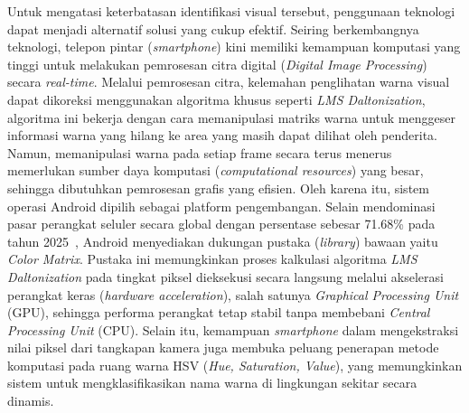 \setlength{\parindent}{2em} Untuk mengatasi keterbatasan identifikasi visual tersebut, penggunaan teknologi dapat menjadi alternatif solusi yang cukup efektif.
Seiring berkembangnya teknologi, telepon pintar (\textit{smartphone}) kini memiliki kemampuan komputasi yang tinggi untuk melakukan pemrosesan citra digital (\textit{Digital Image Processing}) secara \textit{real-time}.
Melalui pemrosesan citra, kelemahan penglihatan warna visual dapat dikoreksi menggunakan algoritma khusus seperti \textit{LMS Daltonization}, algoritma ini bekerja dengan cara memanipulasi matriks warna untuk menggeser informasi warna yang hilang ke area yang masih dapat dilihat oleh penderita.
Namun, memanipulasi warna pada setiap frame secara terus menerus memerlukan sumber daya komputasi (\textit{computational resources}) yang besar, sehingga dibutuhkan pemrosesan grafis yang efisien.
Oleh karena itu, sistem operasi Android dipilih sebagai platform pengembangan.
Selain mendominasi pasar perangkat seluler secara global dengan persentase sebesar 71.68\% pada tahun 2025~\parencite{statcounter2025mobile}, Android menyediakan dukungan pustaka (\textit{library}) bawaan yaitu \textit{Color Matrix}.
Pustaka ini memungkinkan proses kalkulasi algoritma \textit{LMS Daltonization} pada tingkat piksel dieksekusi secara langsung melalui akselerasi perangkat keras (\textit{hardware acceleration}), salah satunya \textit{Graphical Processing Unit} (GPU), sehingga performa perangkat tetap stabil tanpa membebani \textit{Central Processing Unit} (CPU).
Selain itu, kemampuan \textit{smartphone} dalam mengekstraksi nilai piksel dari tangkapan kamera juga membuka peluang penerapan metode komputasi pada ruang warna HSV (\textit{Hue, Saturation, Value}), yang memungkinkan sistem untuk mengklasifikasikan nama warna di lingkungan sekitar secara dinamis.


